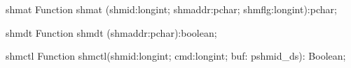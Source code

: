 \begin{function}{shmat}
\Declaration
Function shmat (shmid:longint; shmaddr:pchar; shmflg:longint):pchar;
\Description
\Errors
\SeeAlso
\end{function}

\begin{function}{shmdt}
\Declaration
Function shmdt (shmaddr:pchar):boolean;
\Description
\Errors
\SeeAlso
\end{function}

\begin{function}{shmctl}
\Declaration
Function shmctl(shmid:longint; cmd:longint; buf: pshmid\_ds): Boolean;
\Description
\Errors
\SeeAlso
\end{function}


